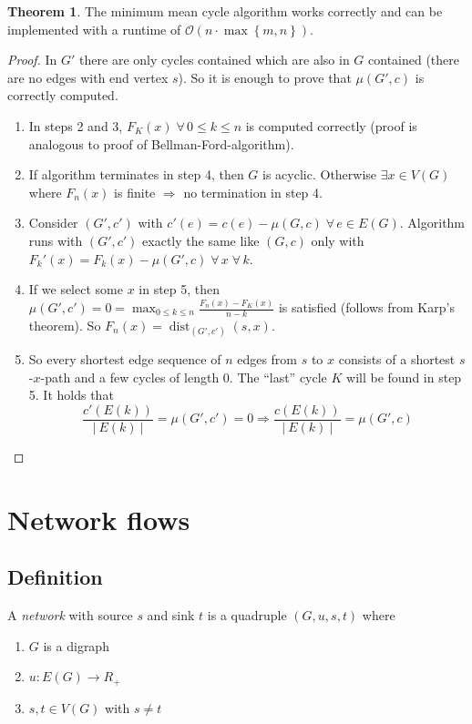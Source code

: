 \documentclass[a4paper]{article}
\theoremstyle{definition}
\newtheorem{theorem}{Theorem}
\newcommand{\card}[1]{\left|\:\!#1\:\!\right|}
\newcommand{\set}[1]{\left\{#1\right\}}
\newcommand{\gath}[2]{$#1$-$#2$-path} %
\newcommand{\fall}{\;\forall\,}
\begin{document}
\begin{theorem}\label{korollar-3.11}
  The minimum mean cycle algorithm works correctly and
  can be implemented with a runtime of $\mathcal{O}(n \cdot\max\set{m,n})$.
\end{theorem}

\begin{proof}
  In $G'$ there are only cycles contained which are also in $G$ contained (there are no edges with end vertex $s$). So it is enough to prove that $\mu(G', c)$ is correctly computed.

  \begin{enumerate}
    \item In steps 2 and 3, $F_K(x) \fall 0 \leq k \leq n$ is computed correctly (proof is analogous to proof of Bellman-Ford-algorithm).
    \item If algorithm terminates in step 4, then $G$ is acyclic. Otherwise $\exists x \in V(G)$ where $F_n(x)$ is finite $\Rightarrow$ no termination in step 4.
    \item Consider $(G', c')$ with $c'(e) = c(e) - \mu(G, c) \fall e \in E(G)$. Algorithm runs with $(G', c')$ exactly the same like $(G, c)$ only with $F_k'(x) = F_k(x) - \mu(G', c) \fall x \fall k$.
    \item If we select some $x$ in step 5, then $\mu(G', c') = 0 = \max_{0 \leq k \leq n} \frac{F_n(x) - F_K(x)}{n-k}$ is satisfied (follows from Karp's theorem). So $F_n(x) = \operatorname{dist}_{(G', c')}(s, x)$.
    \item So every shortest edge sequence of $n$ edges from $s$ to $x$ consists of a shortest \gath sx and a few cycles of length $0$. The ``last'' cycle $K$ will be found in step 5. It holds that
    \[
      \frac{c'(E(k))}{\card{E(k)}} = \mu(G', c') = 0 \Rightarrow \frac{c(E(k))}{\card{E(k)}} = \mu(G', c)
    \]
  \end{enumerate}
\end{proof}

\section{Network flows}
%
\subsection{Definition}
%
A \emph{network} with source $s$ and sink $t$ is a quadruple $(G, u, s, t)$ where
\begin{enumerate}
  \item $G$ is a digraph
  \item $u: E(G) \rightarrow R_+$
  \item $s, t \in V(G)$ with $s \neq t$
\end{enumerate}
\end{document}
